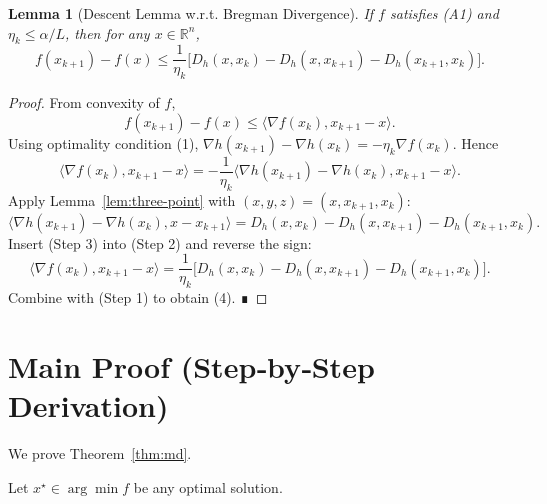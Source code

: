 \documentclass{article}
\newtheorem{lemma}{Lemma}
\newcommand{\Breg}{D_h}
\newcommand{\R}{\mathbb{R}}
\begin{document}
\begin{lemma}[Descent Lemma w.r.t. Bregman Divergence]\label{lem:descent}
If $f$ satisfies (A1) and $\eta_k\le\alpha/L$, then for any $x\in\R^{n}$,
\[
f(x_{k+1})-f(x)\le \frac{1}{\eta_k}\bigl[\Breg(x,x_k)-\Breg(x,x_{k+1})-\Breg(x_{k+1},x_k)\bigr].
\tag{4}
\]
\end{lemma}
\begin{proof}
From convexity of $f$,
\[
f(x_{k+1})-f(x)\le\langle\nabla f(x_k),x_{k+1}-x\rangle .\tag{Step 1}
\]
Using optimality condition (1), $\nabla h(x_{k+1})-\nabla h(x_k)=-\eta_k\nabla f(x_k)$. Hence
\[
\langle\nabla f(x_k),x_{k+1}-x\rangle
= -\frac{1}{\eta_k}\langle\nabla h(x_{k+1})-\nabla h(x_k),x_{k+1}-x\rangle .\tag{Step 2}
\]
Apply Lemma~\ref{lem:three-point} with $(x,y,z)=(x,x_{k+1},x_k)$:
\[
\langle\nabla h(x_{k+1})-\nabla h(x_k),x-x_{k+1}\rangle
= \Breg(x,x_k)-\Breg(x,x_{k+1})-\Breg(x_{k+1},x_k).\tag{Step 3}
\]
Insert (Step 3) into (Step 2) and reverse the sign:
\[
\langle\nabla f(x_k),x_{k+1}-x\rangle
= \frac{1}{\eta_k}\bigl[\Breg(x,x_k)-\Breg(x,x_{k+1})-\Breg(x_{k+1},x_k)\bigr].\tag{Step 4}
\]
Combine with (Step 1) to obtain (4). ∎
\end{proof}

\section*{Main Proof (Step‑by‑Step Derivation)}
We prove Theorem~\ref{thm:md}.  

Let $x^\star\in\arg\min f$ be any optimal solution.
\end{document}
